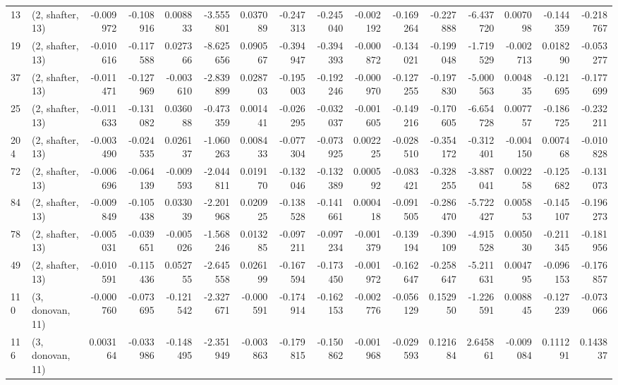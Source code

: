 \begin{tabular}{llrrrrrrrrrrrrrr}
13  &  (2, shafter, 13) &  -0.009972 & -0.108916 &  0.008833 &  -3.555801 &  0.037089 &  -0.247313 & -0.245040 & -0.002192 & -0.169264 & -0.227888 &    -6.437720 &   0.007098 &  -0.144359 &  -0.218767 \\
19  &  (2, shafter, 13) &  -0.010616 & -0.117588 &  0.027366 &  -8.625656 &  0.090567 &  -0.394947 & -0.394393 & -0.000872 & -0.134021 & -0.199048 &    -1.719529 &  -0.002713 &   0.018290 &  -0.053277 \\
37  &  (2, shafter, 13) &  -0.011471 & -0.127969 & -0.003610 &  -2.839899 &  0.028703 &  -0.195003 & -0.192246 & -0.000970 & -0.127255 & -0.197830 &    -5.000563 &   0.004835 &  -0.121695 &  -0.177699 \\
25  &  (2, shafter, 13) &  -0.011633 & -0.131082 &  0.036088 &  -0.473359 &  0.001441 &  -0.026295 & -0.032037 & -0.001605 & -0.149216 & -0.170605 &    -6.654728 &   0.007757 &  -0.186725 &  -0.232211 \\
204 &  (2, shafter, 13) &  -0.003490 & -0.024535 &  0.026137 &  -1.060263 &  0.008433 &  -0.077304 & -0.073925 &  0.002225 & -0.028510 & -0.354172 &    -0.312401 &  -0.004150 &   0.007468 &  -0.010828 \\
72  &  (2, shafter, 13) &  -0.006696 & -0.064139 & -0.009593 &  -2.044811 &  0.019170 &  -0.132046 & -0.132389 &  0.000592 & -0.083421 & -0.328255 &    -3.887041 &   0.002258 &  -0.125682 &  -0.131073 \\
84  &  (2, shafter, 13) &  -0.009849 & -0.105438 &  0.033039 &  -2.201968 &  0.020925 &  -0.138528 & -0.141661 &  0.000418 & -0.091505 & -0.286470 &    -5.722427 &   0.005853 &  -0.145107 &  -0.196273 \\
78  &  (2, shafter, 13) &  -0.005031 & -0.039651 & -0.005026 &  -1.568246 &  0.013285 &  -0.097211 & -0.097234 & -0.001379 & -0.139194 & -0.390109 &    -4.915528 &   0.005030 &  -0.211345 &  -0.181956 \\
49  &  (2, shafter, 13) &  -0.010591 & -0.115436 &  0.052755 &  -2.645558 &  0.026199 &  -0.167594 & -0.173450 & -0.001972 & -0.162647 & -0.258647 &    -5.211631 &   0.004795 &  -0.096153 &  -0.176857 \\
110 &  (3, donovan, 11) &  -0.000760 & -0.073695 & -0.121542 &  -2.327671 & -0.000591 &  -0.174914 & -0.162153 & -0.002776 & -0.056129 &  0.152950 &    -1.226591 &   0.008845 &  -0.127239 &  -0.073066 \\
116 &  (3, donovan, 11) &   0.003164 & -0.033986 & -0.148495 &  -2.351949 & -0.003863 &  -0.179815 & -0.150862 & -0.001968 & -0.029593 &  0.121684 &     2.645861 &  -0.009084 &   0.111291 &   0.143837 \\

\end{tabular}

